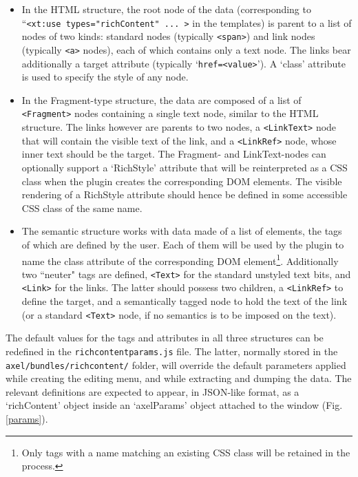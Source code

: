\documentclass[11pt,a4paper]{article}
\begin{document}
\begin{itemize}
\item In the HTML structure, the root node of the data (corresponding to ``\verb?<xt:use types="richContent" ... >? in the templates) is parent to a list of nodes of two kinds: standard nodes (typically \texttt{<span>}) and link nodes (typically \texttt{<a>} nodes), each of which contains only a text node. The links bear additionally a target attribute (typically `\verb?href=<value>?'). A `class' attribute is used to specify the style of any node.

\item In the Fragment-type structure, the data are composed of a list of \texttt{<Fragment>} nodes containing a single text node, similar to the HTML structure. The links however are parents to two nodes, a \texttt{<LinkText>} node that will contain the visible text of the link, and a \texttt{<LinkRef>} node, whose inner text should be the target. The Fragment- and LinkText-nodes can optionally support a `RichStyle' attribute that will be reinterpreted as a CSS class when the plugin creates the corresponding DOM elements. The visible rendering of a RichStyle attribute should hence be defined in some accessible CSS class of the same name.

\item The semantic structure works with data made of a list of elements, the tags of which are defined by the user. Each of them will be used by the plugin to name the class attribute of the corresponding DOM element\footnote{Only tags with a name matching an existing CSS class will be retained in the process.}. Additionally two ``neuter" tags are defined, \texttt{<Text>} for the standard unstyled text bits, and \texttt{<Link>} for the links. The latter should possess two children, a \texttt{<LinkRef>} to define the target, and a semantically tagged node to hold the text of the link (or a standard \texttt{<Text>} node, if no semantics is to be imposed on the text).

\end{itemize}

The default values for the tags and attributes in all three structures can be redefined in the \texttt{richcontentparams.js} file. The latter, normally stored in the \texttt{axel/bundles/richcontent/} folder, will override the default parameters applied while creating the editing menu, and while extracting and dumping the data. The relevant definitions are expected to appear, in JSON-like format, as a `richContent' object inside an `axelParams' object attached to the window (Fig. \ref{params}). 
\end{document}
